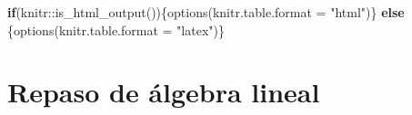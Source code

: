 \documentclass[
]{book}
\newenvironment{Shaded}{\begin{snugshade}}{\end{snugshade}}
\newcommand{\AttributeTok}[1]{\textcolor[rgb]{0.61,0.61,0.61}{#1}}
\newcommand{\ControlFlowTok}[1]{\textcolor[rgb]{0.27,0.27,0.27}{\textbf{#1}}}
\newcommand{\FunctionTok}[1]{\textcolor[rgb]{0,0,0}{#1}}
\newcommand{\NormalTok}[1]{#1}
\newcommand{\SpecialCharTok}[1]{\textcolor[rgb]{0,0,0}{#1}}
\newcommand{\StringTok}[1]{\textcolor[rgb]{0.5,0.5,0.5}{#1}}
\theoremstyle{definition}
\theoremstyle{definition}
\theoremstyle{definition}
\theoremstyle{definition}
\theoremstyle{remark}
\begin{document}
\begin{Shaded}
\begin{Highlighting}[]
\ControlFlowTok{if}\NormalTok{(knitr}\SpecialCharTok{::}\FunctionTok{is\_html\_output}\NormalTok{())\{}\FunctionTok{options}\NormalTok{(}\AttributeTok{knitr.table.format =} \StringTok{"html"}\NormalTok{)\} }\ControlFlowTok{else}\NormalTok{ \{}\FunctionTok{options}\NormalTok{(}\AttributeTok{knitr.table.format =} \StringTok{"latex"}\NormalTok{)\}}
\end{Highlighting}
\end{Shaded}

\mainmatter

\hypertarget{rep_al}{%
\chapter{Repaso de álgebra lineal}\label{rep_al}}

\newcommand{\xdatos}{\mathbf{X}_{n\times p}=\begin{bmatrix}
x_{11} & x_{12} & \cdots & x_{1p}\\
x_{21} & x_{22} & \cdots & x_{2p}\\
\vdots & \vdots & & \vdots \\
x_{n1} & x_{n2} & \cdots & x_{np}
\end{bmatrix}}

\newcommand{\vecmu}{
{\large \underline{\mathbf{\mu}}}\ }

\newcommand{\sumasx}{\begin{bmatrix}
\sum_{i=1}^n x_{i1}\\
\sum_{i=1}^n x_{i2}\\
\vdots  \\
\sum_{i=1}^n x_{ip}
\end{bmatrix}}

\newcommand{\xvector}{\begin{bmatrix}
X_1 \\ X_2 \\ \vdots \\ X_p
\end{bmatrix}}

\newcommand{\smuestral}{\begin{bmatrix}
s_{11} & s_{12} & \cdots & s_{1p}\\
s_{21} & s_{22} & \cdots & s_{2p}\\
\vdots & \vdots & \ddots & \vdots\\
s_{p1} & s_{p2} & \cdots & s_{pp}\\
\end{bmatrix}}
\end{document}
